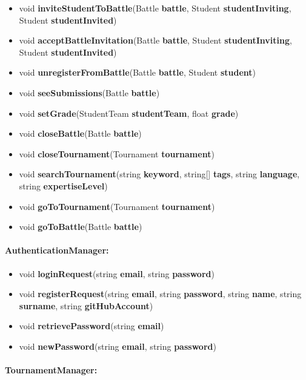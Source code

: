 \documentclass{article}
\begin{document}
\begin{itemize}
    \item void \textbf{inviteStudentToBattle}(Battle \textbf{battle}, Student \textbf{studentInviting}, Student \textbf{studentInvited})
    \item void \textbf{acceptBattleInvitation}(Battle \textbf{battle}, Student \textbf{studentInviting}, Student \textbf{studentInvited})
    \item void \textbf{unregisterFromBattle}(Battle \textbf{battle}, Student \textbf{student})
    \item void \textbf{seeSubmissions}(Battle \textbf{battle})
    \item void \textbf{setGrade}(StudentTeam \textbf{studentTeam}, float \textbf{grade})
    \item void \textbf{closeBattle}(Battle \textbf{battle})
    \item void \textbf{closeTournament}(Tournament \textbf{tournament})
    \item void \textbf{searchTournament}(string \textbf{keyword}, string[] \textbf{tags}, string \textbf{language}, string \textbf{expertiseLevel})
    \item void \textbf{goToTournament}(Tournament \textbf{tournament})
    \item void \textbf{goToBattle}(Battle \textbf{battle})
\end{itemize}

\paragraph{AuthenticationManager:}

\begin{itemize}
    \item void \textbf{loginRequest}(string \textbf{email}, string \textbf{password})
    \item void \textbf{registerRequest}(string \textbf{email}, string \textbf{password}, string \textbf{name}, string \textbf{surname}, string \textbf{gitHubAccount})
    \item void \textbf{retrievePassword}(string \textbf{email})
    \item void \textbf{newPassword}(string \textbf{email}, string \textbf{password})

\end{itemize}

\paragraph{TournamentManager:}
\end{document}
